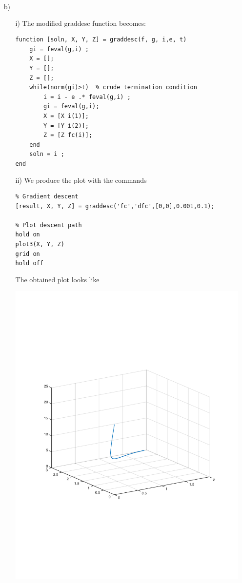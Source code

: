 \documentclass[11pt]{article}
\begin{document}
\begin{itemize}
    \item[b)]
        \begin{itemize}
        \item[i)]
            The modified graddesc function becomes:
            \begin{lstlisting}
function [soln, X, Y, Z] = graddesc(f, g, i,e, t)
    gi = feval(g,i) ;
    X = [];
    Y = [];
    Z = [];
    while(norm(gi)>t)  % crude termination condition
        i = i - e .* feval(g,i) ;
        gi = feval(g,i);
        X = [X i(1)];
        Y = [Y i(2)];
        Z = [Z fc(i)];
    end
    soln = i ;
end
            \end{lstlisting}
        
        \item[ii)]
            We produce the plot with the commands
            \begin{lstlisting}
% Gradient descent
[result, X, Y, Z] = graddesc('fc','dfc',[0,0],0.001,0.1);

% Plot descent path
hold on
plot3(X, Y, Z)
grid on
hold off
            \end{lstlisting}
            
            The obtained plot looks like
            \begin{center}
            \includegraphics[width=\linewidth]{1bii}
            \end{center}
            

\end{itemize}
\end{itemize}
\end{document}
